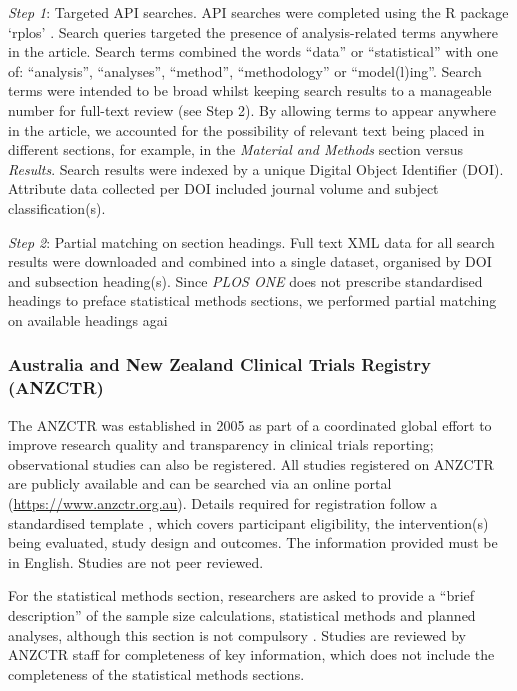 \documentclass[12pt]{article}
\begin{document}
\emph{Step 1}: Targeted API searches. API searches were completed using
the R package `rplos' \citep{rplos}. Search queries targeted the
presence of analysis-related terms anywhere in the article. Search terms
combined the words ``data'' or ``statistical'' with one of:
``analysis'', ``analyses'', ``method'', ``methodology'' or
``model(l)ing''. Search terms were intended to be broad whilst keeping
search results to a manageable number for full-text review (see Step 2).
By allowing terms to appear anywhere in the article, we accounted for
the possibility of relevant text being placed in different sections, for
example, in the \emph{Material and Methods} section versus
\emph{Results}. Search results were indexed by a unique Digital Object
Identifier (DOI). Attribute data collected per DOI included journal
volume and subject classification(s).

\emph{Step 2}: Partial matching on section headings. Full text XML data
for all search results were downloaded and combined into a single
dataset, organised by DOI and subsection heading(s). Since \emph{PLOS
ONE} does not prescribe standardised headings to preface statistical
methods sections, we performed partial matching on available headings
agai

\subsubsection{Australia and New Zealand Clinical Trials Registry (ANZCTR)}
\label{sec:methodsANZCTR}

The ANZCTR was established in 2005 as part of a coordinated global
effort to improve research quality and transparency in clinical trials
reporting; observational studies can also be registered. All studies
registered on ANZCTR are publicly available and can be searched via an
online portal (\url{https://www.anzctr.org.au}). Details required for
registration follow a standardised template \citep{ANZCTR}, which covers
participant eligibility, the intervention(s) being evaluated, study
design and outcomes. The information provided must be in English.
Studies are not peer reviewed.

For the statistical methods section, researchers are asked to provide a
``brief description'' of the sample size calculations, statistical
methods and planned analyses, although this section is not compulsory
\citep{ANZCTR}. Studies are reviewed by ANZCTR staff for completeness of
key information, which does not include the completeness of the
statistical methods sections.
\end{document}
